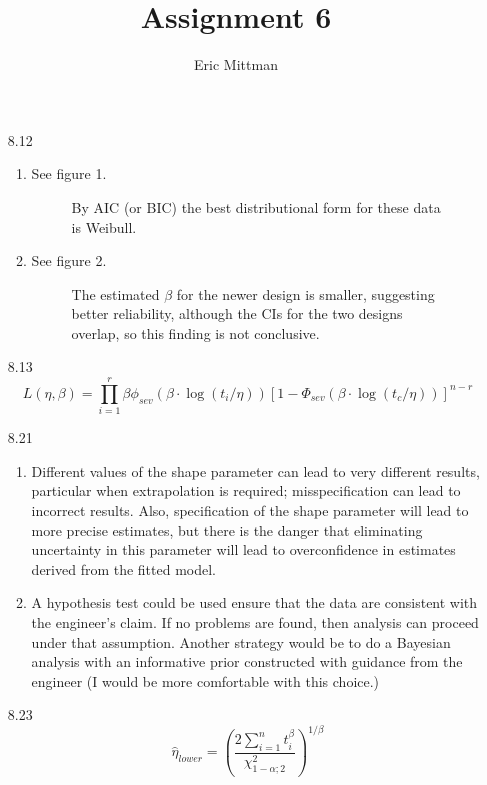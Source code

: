 \documentclass[12pt]{article}\usepackage[]{graphicx}\usepackage[]{color}
\author{Eric Mittman}
\title{Assignment 6}
\begin{document}
  \maketitle
\begin{enumerate}
\item[8.12]
\begin{enumerate}
  \item See figure 1.
  \begin{figure}
    \caption{By AIC (or BIC) the best distributional form for these data is Weibull.}
  \end{figure}

  \item See figure 2.
  \begin{figure}
    \caption{The estimated $\beta$ for the newer design is smaller, suggesting better reliability, although the CIs for the two designs overlap, so this finding is not conclusive.}
    \end{figure}
\end{enumerate}

\item[8.13]
\[L(\eta,\beta) = \prod_{i=1}^{r}\beta \phi_{sev}\left(\beta \cdot \log(t_i/\eta)\right)\left[1-\Phi_{sev}(\beta \cdot \log(t_c/\eta))\right]^{n-r}\]

\item[8.21]
\begin{enumerate}
  \item
  Different values of the shape parameter can lead to very different results, particular when extrapolation is required; misspecification can lead to incorrect results. Also, specification of the shape parameter will lead to more precise estimates, but there is the danger that eliminating uncertainty in this parameter will lead to overconfidence in estimates derived from the fitted model.
  \item
  A hypothesis test could be used ensure that the data are consistent with the engineer's claim. If no problems are found, then analysis can proceed under that assumption. Another strategy would be to do a Bayesian analysis with an informative prior constructed with guidance from the engineer (I would be more comfortable with this choice.)
  
\end{enumerate}
\item[8.23]
\[\hat{\eta}_{lower} = \left( \frac{2\sum_{i=1}^n t_i^\beta}{\chi^2_{1-\alpha;2}}\right)^{1/\beta}\]


\end{enumerate}
\end{document}
